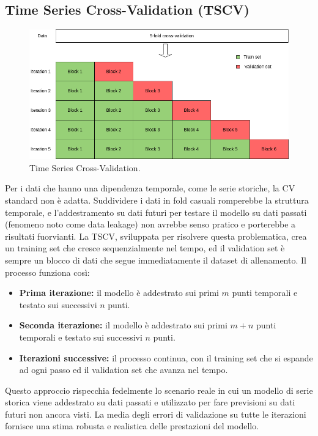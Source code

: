 \documentclass[a4paper,12pt]{report}
\begin{document}
	\subsection{Time Series Cross-Validation (TSCV)}
	\begin{figure}[H]
		\centering
		\includegraphics[width=1.0\textwidth]{img/tscv.png}
		\caption{Time Series Cross-Validation.}
	\end{figure}
	Per i dati che hanno una dipendenza temporale, come le serie storiche, la CV standard non è adatta. Suddividere i dati in fold casuali romperebbe la struttura temporale, e l'addestramento su dati futuri per testare il modello su dati passati (fenomeno noto come data leakage) non avrebbe senso pratico e porterebbe a risultati fuorvianti. La TSCV, sviluppata per risolvere questa problematica, crea un training set che cresce sequenzialmente nel tempo, ed il validation set è sempre un blocco di dati che segue immediatamente il dataset di allenamento. Il processo funziona così:
	\begin{itemize}
		\item \textbf{Prima iterazione:} il modello è addestrato sui primi $m$ punti temporali e testato sui successivi $n$ punti.
		\item \textbf{Seconda iterazione:} il modello è addestrato sui primi $m+n$ punti temporali e testato sui successivi $n$ punti.
		\item \textbf{Iterazioni successive:} il processo continua, con il training set che si espande ad ogni passo ed il validation set che avanza nel tempo.
	\end{itemize}
	Questo approccio rispecchia fedelmente lo scenario reale in cui un modello di serie storica viene addestrato su dati passati e utilizzato per fare previsioni su dati futuri non ancora visti. La media degli errori di validazione su tutte le iterazioni fornisce una stima robusta e realistica delle prestazioni del modello.
	
\end{document}
